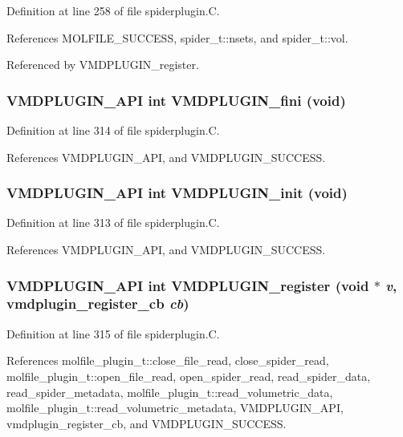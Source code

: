 Definition at line 258 of file spiderplugin.C.

References MOLFILE\_\-SUCCESS, spider\_\-t::nsets, and spider\_\-t::vol.

Referenced by VMDPLUGIN\_\-register.
\subsubsection{\setlength{\rightskip}{0pt plus 5cm}VMDPLUGIN\_\-API int VMDPLUGIN\_\-fini (void)}\label{spiderplugin_8C_a7}




Definition at line 314 of file spiderplugin.C.

References VMDPLUGIN\_\-API, and VMDPLUGIN\_\-SUCCESS.
\subsubsection{\setlength{\rightskip}{0pt plus 5cm}VMDPLUGIN\_\-API int VMDPLUGIN\_\-init (void)}\label{spiderplugin_8C_a6}




Definition at line 313 of file spiderplugin.C.

References VMDPLUGIN\_\-API, and VMDPLUGIN\_\-SUCCESS.
\subsubsection{\setlength{\rightskip}{0pt plus 5cm}VMDPLUGIN\_\-API int VMDPLUGIN\_\-register (void $\ast$ {\em v}, {\bf vmdplugin\_\-register\_\-cb} {\em cb})}\label{spiderplugin_8C_a8}




Definition at line 315 of file spiderplugin.C.

References molfile\_\-plugin\_\-t::close\_\-file\_\-read, close\_\-spider\_\-read, molfile\_\-plugin\_\-t::open\_\-file\_\-read, open\_\-spider\_\-read, read\_\-spider\_\-data, read\_\-spider\_\-metadata, molfile\_\-plugin\_\-t::read\_\-volumetric\_\-data, molfile\_\-plugin\_\-t::read\_\-volumetric\_\-metadata, VMDPLUGIN\_\-API, vmdplugin\_\-register\_\-cb, and VMDPLUGIN\_\-SUCCESS.

